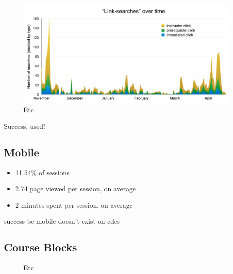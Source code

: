 \begin{figure}
  \centering
  \includegraphics[width=1.0\textwidth]{images/graph/linksearches}

  \caption{Etc}
  \label{fig:linksearches}
\end{figure}

Success, used!

\subsection{Mobile}

\begin{itemize}
  \item 11.54\% of sessions
  \item 2.74 page viewed per session, on average
  \item 2 minutes spent per session, on average
\end{itemize}

success bc mobile doesn't exist on cdcs

\subsection{Course Blocks}

\begin{figure}
  \centering


  \caption{Etc}
  \label{fig:searchtypes}

\end{figure}

